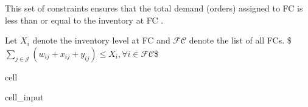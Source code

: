 \documentclass[letterpaper,10pt,english]{jupyterBook}
\begin{document}
\sphinxAtStartPar
This set of constraints ensures that the total demand (orders) assigned to FC  is less than or equal to the inventory at FC .

\sphinxAtStartPar
Let \(X_i\) denote the inventory level at FC  and \(\mathcal{FC}\) denote the list of all FCs.
\$\(\sum_{j\in\mathcal{J}} \left( w_{ij} + x_{ij} + y_{ij} \right) \leq X_i, \forall i\in \mathcal{FC} \)\$

\begin{sphinxuseclass}{cell}\begin{sphinxVerbatimInput}

\begin{sphinxuseclass}{cell_input}
\begin{sphinxVerbatim}[commandchars=\\\{\}]

   
    \PYG{p}{[}\PYG{p}{]}  \PYG{p}{[}\PYG{p}{]}  \PYG{p}{[}\PYG{p}{]}      \PYG{p}{[}\PYG{p}{]}
    
\end{sphinxVerbatim}

\end{sphinxuseclass}\end{sphinxVerbatimInput}
\begin{sphinxVerbatimOutput}


\end{sphinxVerbatimOutput}
\end{sphinxuseclass}
\end{document}
